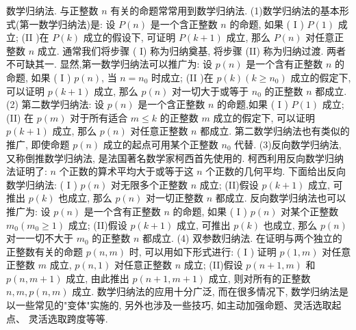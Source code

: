 
数学归纳法.
与正整数 $n$ 有关的命题常常用到数学归纳法.
(1)数学归纳法的基本形式(第一数学归纳法)是:
设 $P(n)$ 是一个含正整数 $n$ 的命题, 如果
( I ) $P(1)$ 成立;
(II )在 $P(k)$ 成立的假设下, 可证明 $P(k+1)$ 成立,
那么 $P(n)$ 对任意正整数 $n$ 成立.
通常我们将步骤 ( I) 称为归纳奠基, 将步骤 (II) 称为归纳过渡.
两者不可缺其一.
显然,第一数学归纳法可以推广为:
设 $p(n)$ 是一个含有正整数 $n$ 的命题, 如果
( I ) $p(n)$, 当 $n=n_0$ 时成立;
(II )在 $p(k)\left(k \geqslant n_0\right)$ 成立的假定下, 可以证明 $p(k+1)$ 成立, 那么 $p(n)$ 对一切大于或等于 $n_0$ 的正整数 $n$ 都成立.
(2) 第二数学归纳法: 设 $p(n)$ 是一个含正整数 $n$ 的命题,如果
( I ) $P(1)$ 成立;
(II) 在 $p(m)$ 对于所有适合 $m \leqslant k$ 的正整数 $m$ 成立的假定下, 可以证明 $p(k+1)$ 成立,
那么 $p(n)$ 对任意正整数 $n$ 都成立.
第二数学归纳法也有类似的推广, 即使命题 $p(n)$ 成立的起点可用某个正整数 $n_0$ 代替.
(3)反向数学归纳法, 又称倒推数学归纳法, 是法国著名数学家柯西首先使用的.
柯西利用反向数学归纳法证明了: $n$ 个正数的算术平均大于或等于这 $n$ 个正数的几何平均.
下面给出反向数学归纳法:
( I ) $p(n)$ 对无限多个正整数 $n$ 成立;
(II)假设 $p(k+1)$ 成立, 可推出 $p(k)$ 也成立,
那么 $p(n)$ 对一切正整数 $n$ 都成立.
反向数学归纳法也可以推广为:
设 $p(n)$ 是一个含有正整数 $n$ 的命题, 如果
( I ) $p(n)$ 对某个正整数 $m_0\left(m_0 \geqslant 1\right)$ 成立;
(II)假设 $p(k+1)$ 成立, 可推出 $p(k)$ 也成立,
那么 $p(n)$ 对一一切不大于 $m_0$ 的正整数 $n$ 都成立.
(4) 双参数归纳法.
在证明与两个独立的正整数有关的命题 $p(n, m)$ 时, 可以用如下形式进行:
( I ) 证明 $p(1, m)$ 对任意正整数 $m$ 成立, $p(n, 1)$ 对任意正整数 $n$ 成立;
(II)假设 $p(n+1, m)$ 和 $p(n, m+1)$ 成立, 由此推出 $p(n+1, m+1)$ 成立, 则对所有的正整数 $n, m, p(n, m)$ 成立.
数学归纳法的应用十分广泛, 而在很多情况下, 数学归纳法是以一些常见的"变体"实施的, 另外也涉及一些技巧, 如主动加强命题、灵活选取起点、 灵活选取跨度等等.



